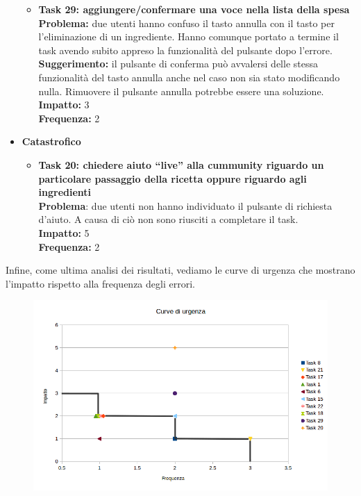 \begin{itemize}
\begin{itemize}
			\item \textbf{Task 29: aggiungere/confermare una voce nella
lista della spesa}\\
				\textbf{Problema:} due utenti hanno confuso il tasto annulla con il tasto per
				l'eliminazione di un ingrediente. Hanno comunque portato a termine il task
				avendo subito appreso la funzionalità del pulsante dopo l'errore.\\
				\textbf{Suggerimento:} il pulsante di conferma può
				avvalersi delle stessa funzionalità del tasto annulla anche nel caso non
				sia stato modificando nulla. Rimuovere il pulsante annulla potrebbe
				essere una soluzione.\\
				\textbf{Impatto:} 3\\
				\textbf{Frequenza:} 2\\
		\end{itemize}

	\item \textbf{Catastrofico}
		\begin{itemize}
			\item \textbf{Task 20: chiedere aiuto ``live'' alla cummunity riguardo un
				particolare passaggio della ricetta oppure riguardo agli ingredienti}\\
				\textbf{Problema}: due utenti non hanno individuato il pulsante di
				richiesta d'aiuto. A causa di ciò non sono riusciti a completare il
				task.\\
				\textbf{Impatto:} 5\\
				\textbf{Frequenza:} 2\\
		\end{itemize}

\end{itemize}

Infine, come ultima analisi dei risultati, vediamo le curve di urgenza
che mostrano l'impatto rispetto alla frequenza degli errori.

\begin{figure}[H]
	\includegraphics[width=\linewidth]{img/curve-urgenza.png}
\end{figure}

